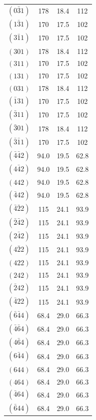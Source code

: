 \begin{table}[H]
\begin{tabular}{c|c|c|c}
        $(0\bar{3}1)$ & \num{178} & \num{18,4} & \num{112} \\
        $(1\bar{3}1)$ & \num{170} & \num{17,5} & \num{102} \\
        $(3\bar{1}1)$ & \num{170} & \num{17,5} & \num{102} \\
        $(301)$ & \num{178} & \num{18,4} & \num{112} \\
        $(311)$ & \num{170} & \num{17,5} & \num{102} \\
        $(131)$ & \num{170} & \num{17,5} & \num{102} \\
        $(031)$ & \num{178} & \num{18,4} & \num{112} \\
        $(\bar{1}31)$ & \num{170} & \num{17,5} & \num{102} \\
        $(\bar{3}11)$ & \num{170} & \num{17,5} & \num{102} \\
        $(\bar{3}01)$ & \num{178} & \num{18,4} & \num{112} \\
        $(\bar{3}\bar{1}1)$ & \num{170} & \num{17,5} & \num{102} \\
        $(\bar{4}\bar{4}2)$ & \num{94,0} & \num{19,5} & \num{62,8} \\
        $(4\bar{4}2)$ & \num{94,0} & \num{19,5} & \num{62,8} \\
        $(442)$ & \num{94,0} & \num{19,5} & \num{62,8} \\
        $(\bar{4}42)$ & \num{94,0} & \num{19,5} & \num{62,8} \\
        $(\bar{4}\bar{2}2)$ & \num{115} & \num{24,1} & \num{93,9} \\
        $(\bar{2}\bar{4}2)$ & \num{115} & \num{24,1} & \num{93,9} \\
        $(2\bar{4}2)$ & \num{115} & \num{24,1} & \num{93,9} \\
        $(4\bar{2}2)$ & \num{115} & \num{24,1} & \num{93,9} \\
        $(422)$ & \num{115} & \num{24,1} & \num{93,9} \\
        $(242)$ & \num{115} & \num{24,1} & \num{93,9} \\
        $(\bar{2}42)$ & \num{115} & \num{24,1} & \num{93,9} \\
        $(\bar{4}22)$ & \num{115} & \num{24,1} & \num{93,9} \\
        $(\bar{6}\bar{4}4)$ & \num{68,4} & \num{29,0} & \num{66,3} \\
        $(\bar{4}\bar{6}4)$ & \num{68,4} & \num{29,0} & \num{66,3} \\
        $(4\bar{6}4)$ & \num{68,4} & \num{29,0} & \num{66,3} \\
        $(6\bar{4}4)$ & \num{68,4} & \num{29,0} & \num{66,3} \\
        $(644)$ & \num{68,4} & \num{29,0} & \num{66,3} \\
        $(464)$ & \num{68,4} & \num{29,0} & \num{66,3} \\
        $(\bar{4}64)$ & \num{68,4} & \num{29,0} & \num{66,3} \\
        $(\bar{6}44)$ & \num{68,4} & \num{29,0} & \num{66,3}                
    \end{tabular}\label{tab:keineahnung}
\end{table}